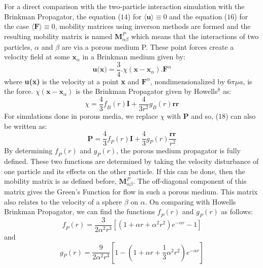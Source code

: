 \documentclass[12pt]{article}
\begin{document}
For a direct comparison with the two-particle interaction simulation with the Brinkman Propagator, the equation ($14$) for $\langle \textbf{u} \rangle\equiv 0$ and the equation ($16$) for the case $\langle \textbf{F} \rangle\equiv 0$, mobility matrices using inverson methods are formed and the resulting mobility matrix is named $\textbf{M}^{P}_{\alpha\beta}$ which means that the interactions of two particles, $\alpha$ and $\beta$ are via a porous medium P. These point forces create a velocity field at some $\textbf{x}_{\alpha}$ in a Brinkman medium given by:
\begin{equation}
\label{eq17}
\textbf{u(x)} = \frac{3}{4} \textbf{.} \chi (\textbf{x}-\textbf{x}_{\alpha})\textbf{.}\textbf{F}^{\alpha}
\end{equation} where \textbf{u(x)} is the velocity at a point \textbf{x} and $\textbf{F}^{\alpha}$, nondimensionalized by $6 \pi \mu a$, is the force. $\chi (\textbf{x}-\textbf{x}_{\alpha})$
is the Brinkman Propagator given by Howells$^8$ as:
\begin{equation}
\label{eq19}
\chi=\frac{4}{3}\textit{f}_{B}(r)\textbf{I} + \frac{4}{3r^2}\textit{g}_{B}(r)\textbf{rr}
\end{equation}
For simulations done in porous media, we replace $\chi$ with  \textbf{P} and so, ($18$) can also be written as:
\begin{equation}
\label{eq20}
\textbf{P}=\frac{4}{3}\textit{f}_{P}(r)\textbf{I} + \frac{4}{3}\textit{g}_{P}(r) \frac{\textbf{rr}}{r^2}
\end{equation}
By determining $\textit{f}_P(r)$ and $\textit{g}_{P}(r)$, the porous medium propagator is fully defined. These two functions are determined by taking the velocity disturbance of one particle and its effects on the other particle. If this can be done, then the mobility matrix is as defined before, $\textbf{M}^{P}_{\alpha\beta}$. The off-diagonal component of this matrix gives the Green's Function for flow in such a porous medium. This matrix also relates to the velocity of a sphere $\beta$ on $\alpha$. On comparing with Howells Brinkman Propagator, we can find the functions $\textit{f}_P(r)$ and $\textit{g}_{P}(r)$ as follows:
\begin{equation}
\textit{f}_{P}(r)=\frac{3}{2 \alpha^2 r^3}\left[(1+\alpha r + \alpha^2 r^2)e^{-\alpha r}-1\right]
\end{equation}
and
\begin{equation}
\textit{g}_{P}(r)= \frac{9}{2 \alpha^2 r^3}\left[1-(1+\alpha r + \frac{1}{3}\alpha^2 r^2)e^{-\alpha r}\right]
\end{equation}
\end{document}
